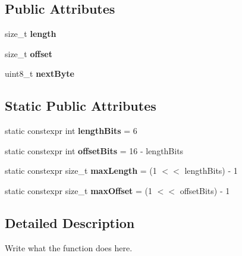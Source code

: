 \subsection*{Public Attributes}
\begin{DoxyCompactItemize}
\item 
\hypertarget{structLZ77CodeType_a1293f16ab8da36535682268031ec12a2}{size\+\_\+t {\bfseries length}}\label{structLZ77CodeType_a1293f16ab8da36535682268031ec12a2}

\item 
\hypertarget{structLZ77CodeType_a99e75c41fc2a5d36496e2eb6c675e8ce}{size\+\_\+t {\bfseries offset}}\label{structLZ77CodeType_a99e75c41fc2a5d36496e2eb6c675e8ce}

\item 
\hypertarget{structLZ77CodeType_ad5e0d80546417194466ff5300d0abc6f}{uint8\+\_\+t {\bfseries next\+Byte}}\label{structLZ77CodeType_ad5e0d80546417194466ff5300d0abc6f}

\end{DoxyCompactItemize}
\subsection*{Static Public Attributes}
\begin{DoxyCompactItemize}
\item 
\hypertarget{structLZ77CodeType_af6ddc790f261e742edf7e4c9730f2428}{static constexpr int {\bfseries length\+Bits} = 6}\label{structLZ77CodeType_af6ddc790f261e742edf7e4c9730f2428}

\item 
\hypertarget{structLZ77CodeType_a73491cf97e707f632e18d331d88c9aec}{static constexpr int {\bfseries offset\+Bits} = 16 -\/ length\+Bits}\label{structLZ77CodeType_a73491cf97e707f632e18d331d88c9aec}

\item 
\hypertarget{structLZ77CodeType_a91907290a8a919c21b5312ece5fe5eb4}{static constexpr size\+\_\+t {\bfseries max\+Length} = (1 $<$$<$ length\+Bits) -\/ 1}\label{structLZ77CodeType_a91907290a8a919c21b5312ece5fe5eb4}

\item 
\hypertarget{structLZ77CodeType_a07cb40a10cc2f689a9323c0f6533ed3c}{static constexpr size\+\_\+t {\bfseries max\+Offset} = (1 $<$$<$ offset\+Bits) -\/ 1}\label{structLZ77CodeType_a07cb40a10cc2f689a9323c0f6533ed3c}

\end{DoxyCompactItemize}


\subsection{Detailed Description}
Write what the function does here. 

